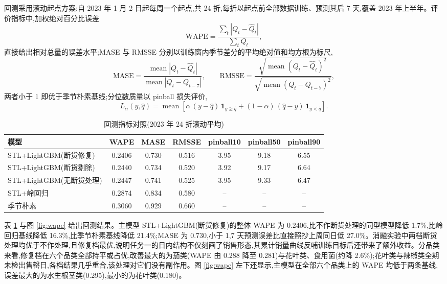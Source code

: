 回测采用滚动起点方案:自 2023 年 1 月 2 日起每周一个起点,共 24 折,每折以起点前全部数据训练、预测其后 7 天,覆盖 2023 年上半年。评价指标中,加权绝对百分比误差
\begin{equation}
  \mathrm{WAPE}=\frac{\sum_t \left|Q_t-\hat{Q}_t\right|}{\sum_t Q_t},
\end{equation}
直接给出相对总量的误差水平;MASE 与 RMSSE 分别以训练窗内季节差分的平均绝对值和均方根为标尺,
\begin{equation}
  \mathrm{MASE}=\frac{\operatorname*{mean}\left|Q_t-\hat{Q}_t\right|}
  {\operatorname*{mean}\left|Q_t-Q_{t-7}\right|},
  \qquad
  \mathrm{RMSSE}=\frac{\sqrt{\operatorname*{mean}\left(Q_t-\hat{Q}_t\right)^2}}
  {\sqrt{\operatorname*{mean}\left(Q_t-Q_{t-7}\right)^2}},
\end{equation}
两者小于 1 即优于季节朴素基线;分位数质量以 pinball 损失评价,
\begin{equation}
  L_\alpha(y,\hat{q})=\operatorname*{mean}\left[\alpha\,(y-\hat{q})\,\mathbf{1}_{y\ge\hat{q}}+(1-\alpha)\,(\hat{q}-y)\,\mathbf{1}_{y<\hat{q}}\right].
\end{equation}

\begin{table}[htbp]
  \centering
  \caption{回测指标对照(2023 年 24 折滚动平均)}
  \label{tab:bt}
  \begin{tabular}{lcccccc}
    \toprule
    模型 & WAPE & MASE & RMSSE & pinball10 & pinball50 & pinball90 \\
    \midrule
    STL+LightGBM(断货修复) & 0.2406 & 0.730 & 0.516 & 3.95 & 9.18 & 6.55 \\
    STL+LightGBM(断货剔除) & 0.2440 & 0.734 & 0.520 & 3.92 & 9.17 & 6.64 \\
    STL+LightGBM(无断货处理) & 0.2447 & 0.741 & 0.525 & 3.95 & 9.33 & 6.47 \\
    STL+岭回归 & 0.2874 & 0.834 & 0.580 & -- & -- & -- \\
    季节朴素 & 0.3060 & 0.929 & 0.660 & -- & -- & -- \\
    \bottomrule
  \end{tabular}
\end{table}

表 \ref{tab:bt} 与图 \ref{fig:wape} 给出回测结果。主模型 STL+LightGBM(断货修复)的整体 WAPE 为 0.2406,比不作断货处理的同型模型降低 1.7\%,比岭回归基线降低 16.3\%,比季节朴素基线降低 21.4\%;MASE 为 0.730,小于 1,7 天预测误差比直接照抄上周同日低 27.0\%。消融实验中两档断货处理均优于不作处理,且修复档最优,说明任务一的日内结构不仅刻画了销售形态,其累计销量曲线反哺训练目标后还带来了额外收益。分品类来看,修复档在六个品类全部持平或占优,改善最大的为茄类(WAPE 由 0.288 降至 0.281)与花叶类、食用菌(约降 2.6\%);花叶类与辣椒类全期未检出售罄日,各档结果几乎重合,该处理对它们没有副作用。图 \ref{fig:wape} 左下还显示,主模型在全部六个品类上的 WAPE 均低于两条基线,误差最大的为水生根茎类(0.295),最小的为花叶类(0.180)。

